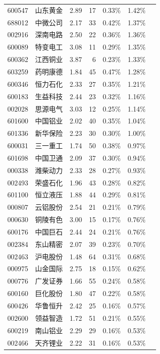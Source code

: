 \documentclass[11pt,a4paper]{article}
\begin{document}
{\begin{longtable}{@{}llrrrrl@{}}
600547 & 山东黄金 & 2.89 & 17 & 0.33\% & 1.42\% &  \\
688012 & 中微公司 & 2.17 & 33 & 0.42\% & 1.37\% &  \\
002916 & 深南电路 & 2.50 & 22 & 0.36\% & 1.36\% &  \\
600089 & 特变电工 & 3.08 & 11 & 0.29\% & 1.35\% &  \\
600362 & 江西铜业 & 3.87 & 6 & 0.23\% & 1.33\% &  \\
603259 & 药明康德 & 1.84 & 45 & 0.47\% & 1.28\% &  \\
600346 & 恒力石化 & 2.33 & 27 & 0.35\% & 1.21\% &  \\
600183 & 生益科技 & 2.44 & 23 & 0.32\% & 1.16\% &  \\
002028 & 思源电气 & 3.03 & 12 & 0.25\% & 1.14\% &  \\
601600 & 中国铝业 & 2.02 & 40 & 0.35\% & 1.04\% &  \\
601336 & 新华保险 & 2.23 & 30 & 0.30\% & 1.00\% &  \\
600031 & 三一重工 & 1.74 & 50 & 0.38\% & 0.97\% &  \\
601698 & 中国卫通 & 2.09 & 37 & 0.30\% & 0.94\% &  \\
000338 & 潍柴动力 & 2.33 & 28 & 0.27\% & 0.93\% &  \\
002493 & 荣盛石化 & 1.96 & 43 & 0.28\% & 0.82\% &  \\
601100 & 恒立液压 & 1.88 & 44 & 0.29\% & 0.81\% &  \\
000807 & 云铝股份 & 2.54 & 21 & 0.21\% & 0.79\% &  \\
000630 & 铜陵有色 & 3.00 & 15 & 0.17\% & 0.76\% &  \\
600176 & 中国巨石 & 2.44 & 24 & 0.21\% & 0.76\% &  \\
002384 & 东山精密 & 2.07 & 39 & 0.23\% & 0.70\% &  \\
002463 & 沪电股份 & 1.48 & 64 & 0.31\% & 0.68\% &  \\
000975 & 山金国际 & 2.75 & 18 & 0.15\% & 0.62\% &  \\
000776 & 广发证券 & 1.66 & 55 & 0.24\% & 0.58\% &  \\
600160 & 巨化股份 & 1.80 & 47 & 0.22\% & 0.58\% &  \\
600426 & 华鲁恒升 & 2.42 & 25 & 0.16\% & 0.57\% &  \\
002600 & 领益智造 & 1.72 & 51 & 0.21\% & 0.55\% &  \\
600219 & 南山铝业 & 2.29 & 29 & 0.16\% & 0.53\% &  \\
002466 & 天齐锂业 & 2.22 & 31 & 0.16\% & 0.53\% &  \\

\end{longtable}}
\end{document}
